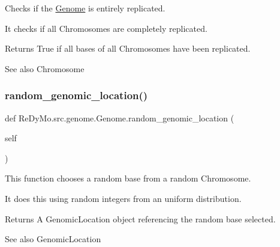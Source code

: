 Checks if the \mbox{\hyperlink{classReDyMo_1_1src_1_1genome_1_1Genome}{Genome}} is entirely replicated. 

It checks if all Chromosomes are completely replicated. \begin{DoxyReturn}{Returns}
True if all bases of all Chromosomes have been replicated. 
\end{DoxyReturn}
\begin{DoxySeeAlso}{See also}
Chromosome 
\end{DoxySeeAlso}
\mbox{\label{classReDyMo_1_1src_1_1genome_1_1Genome_a52ff5976c29d7f3308634d1806f0e6e5}} 
\subsubsection{\texorpdfstring{random\+\_\+genomic\+\_\+location()}{random\_genomic\_location()}}
{\footnotesize\ttfamily def Re\+Dy\+Mo.\+src.\+genome.\+Genome.\+random\+\_\+genomic\+\_\+location (\begin{DoxyParamCaption}\item[{}]{self }\end{DoxyParamCaption})}



This function chooses a random base from a random Chromosome. 

It does this using random integers from an uniform distribution. \begin{DoxyReturn}{Returns}
A Genomic\+Location object referencing the random base selected. 
\end{DoxyReturn}
\begin{DoxySeeAlso}{See also}
Genomic\+Location 
\end{DoxySeeAlso}
\mbox{\label{classReDyMo_1_1src_1_1genome_1_1Genome_a5ccf7050477245b02282b76b2cf72030}} 
